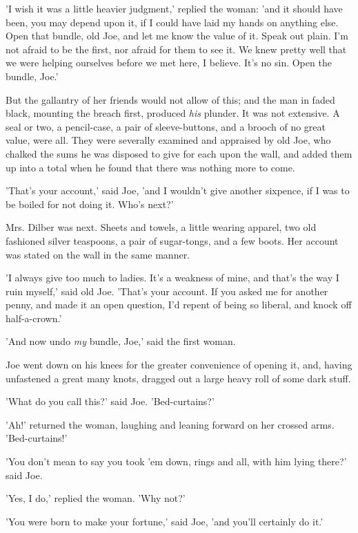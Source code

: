 'I wish it was a little heavier judgment,' replied the woman: 'and it
should have been, you may depend upon it, if I could have laid my hands
on anything else. Open that bundle, old Joe, and let me know the value
of it. Speak out plain. I'm not afraid to be the first, nor afraid for
them to see it. We knew pretty well that we were helping ourselves
before we met here, I believe. It's no sin. Open the bundle, Joe.'

But the gallantry of her friends would not allow of this; and the man in
faded black, mounting the breach first, produced \emph{his} plunder. It was
not extensive. A seal or two, a pencil-case, a pair of sleeve-buttons,
and a brooch of no great value, were all. They were severally examined
and appraised by old Joe, who chalked the sums he was disposed to give
for each upon the wall, and added them up into a total when he found
that there was nothing more to come.

'That's your account,' said Joe, 'and I wouldn't give another sixpence,
if I was to be boiled for not doing it. Who's next?'


Mrs. Dilber was next. Sheets and towels, a little wearing apparel, two
old fashioned silver teaspoons, a pair of sugar-tongs, and a few
boots. Her account was stated on the wall in the same manner.

'I always give too much to ladies. It's a weakness of mine, and that's
the way I ruin myself,' said old Joe. 'That's your account. If you asked
me for another penny, and made it an open question, I'd repent of being
so liberal, and knock off half-a-crown.'

'And now undo \emph{my} bundle, Joe,' said the first woman.

Joe went down on his knees for the greater convenience of opening it,
and, having unfastened a great many knots, dragged out a large heavy
roll of some dark stuff.

'What do you call this?' said Joe. 'Bed-curtains?'

'Ah!' returned the woman, laughing and leaning forward on her crossed
arms. 'Bed-curtains!'

'You don't mean to say you took 'em down, rings and all, with him lying
there?' said Joe.

'Yes, I do,' replied the woman. 'Why not?'

'You were born to make your fortune,' said Joe, 'and you'll certainly do
it.'

